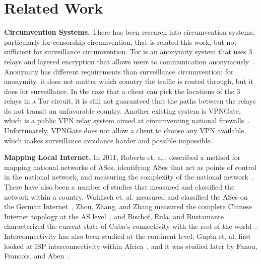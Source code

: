 \section{Related Work}
\label{related}

{\bf Circumvention Systems.}  There has been research into circumvention systems, particularly for censorship circumvention, that is related this work, but not sufficient for surveillance circumvention.  Tor is an anonymity system that uses 3 relays and layered encryption that allows users to communication anonymously~\cite{dingledine2004tor}.  Anonymity has different requirements than surveillance circumvention; for anonymity, it does not matter which country the traffic is routed through, but it does for surveillance.  In the case that a client can pick the locations of the 3 relays in a Tor circuit, it is still not guaranteed that the paths between the relays do not transit an unfavorable country.  Another existing system is VPNGate, which is a public VPN relay system aimed at circumventing national firewalls~\cite{nobori2014vpn}.  Unfortunately, VPNGate does not allow a client to choose any VPN available, which makes surveillance avoidance harder and possible impossible.

{\bf Mapping Local Internet.}  In 2011, Roberts et. al., described a method for mapping national networks of ASes, identifying ASes that act as points of control in the national network, and measuring the complexity of the national network~\cite{roberts2011mapping}.  There have also been a number of studies that measured and classified the network within a country.  Wahlisch et. al. measured and classified the ASes on the German Internet~\cite{wahlisch2010framework, wahlisch2012exposing}, Zhou, Zhang, and Zhang measured the complete Chinese Internet topology at the AS level~\cite{zhou2007chinese}, and Bischof, Rula, and Bustamante characterized the current state of Cuba's connectivity with the rest of the world~\cite{bischof2015and}.  Interconnectivity has also been studied at the continent level; Gupta et. al. first looked at ISP interconnectivity within Africa~\cite{gupta2014peering}, and it was studied later by Fanou, Francois, and Aben~\cite{fanou2015diversity}.

